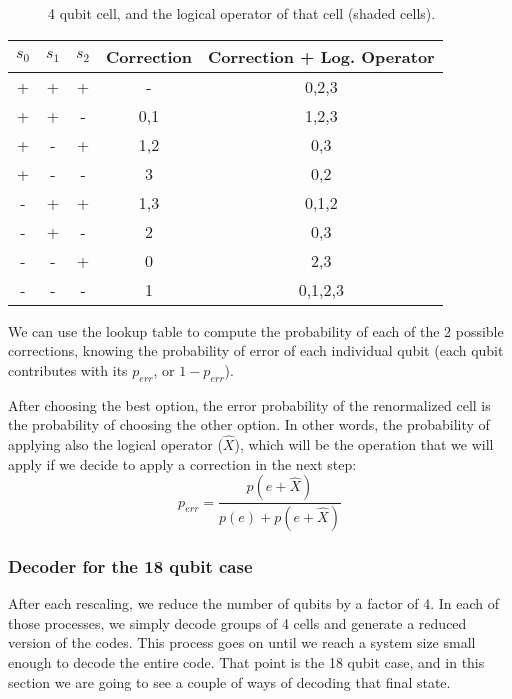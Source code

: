 \documentclass[a4paper,12pt]{article}
\begin{document}
\begin{figure}[ht!]
\begin{center}
\caption{4 qubit cell, and the logical operator of that cell (shaded cells).}

\end{center}
\end{figure}
\begin{table}
\begin{center}
\begin{tabular}{|ccc|c|c|}

\hline
$s_0$&$s_1$	&$s_2$&Correction&Correction + Log. Operator\\
\hline
+	&+	&+	&-	&0,2,3	\\
+	&+	&-	&0,1	&1,2,3	\\
+	&-	&+	&1,2	&0,3		\\
+	&-	&-	&3	&0,2		\\
-	&+	&+	&1,3	&0,1,2	\\
-	&+	&-	&2	&0,3		\\
-	&-	&+	&0	&2,3		\\
-	&-	&-	&1	&0,1,2,3	\\
\hline
\end{tabular}
\end{center}
\end{table}

We can use the lookup table to compute the probability of each of the 2 possible corrections, knowing the probability of error of each individual qubit (each qubit contributes with its $p_{err}$, or $1-p_{err}$).


After choosing the best option, the error probability of the renormalized cell is the probability of choosing the other option. In other words, the probability of applying also the logical operator ($\hat{X}$), which will be the operation that we will apply if we decide to apply a correction in the next step:
\begin{equation}
p_{err}=\frac{p(e+\hat{X})}{p(e)+p(e+\hat{X})}
\end{equation}

\subsubsection{Decoder for the 18 qubit case}

After each rescaling, we reduce the number of qubits by a factor of 4. In each of those processes, we simply decode groups of 4 cells and generate a reduced version of the codes. This process goes on until we reach a system size small enough to decode the entire code. That point is the 18 qubit case, and in this section we are going to see a couple of ways of decoding that final state.\\
\end{document}
